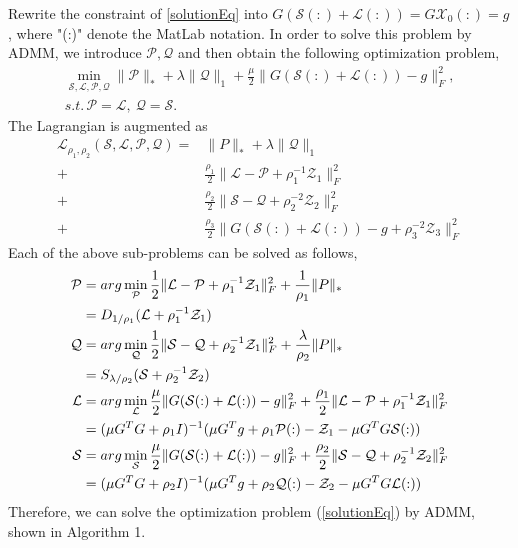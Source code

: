 \documentclass[journal,transmag]{IEEEtran}
\theoremstyle{plain}
\begin{document}
Rewrite the constraint of \ref{solutionEq} into $G\mathcal{(S(:)+L(:))}=G\mathcal{X}_0(:)=g$, where "(:)" denote the MatLab notation. In order to solve this problem by ADMM, we introduce $\mathcal{P}, \mathcal{Q}$ and then obtain the following optimization problem,
\begin{align*}
 \min_{\mathcal{S},\mathcal{L},\mathcal{P},\mathcal{Q}}\|\mathcal{P}
\|_*+\lambda \|\mathcal{Q}\|_1+\frac{\mu}{2}\|G\mathcal{(S(:)+L(:))}-g\|_{F}^2,\\
 s.t.\, \mathcal{P=L,~Q=S}.
\end{align*}
The Lagrangian is augmented as
\begin{align*}
\mathcal{L}_{\rho_1,\rho_2}(\mathcal{S},\mathcal{L},\mathcal{P},\mathcal{Q})
=&\|P\|_*+\lambda \|\mathcal{Q}\|_1\\
+&\frac{\rho_1}{2}\|\mathcal{L-P}+\rho_1^{-1}\mathcal{Z}_1\|_{F}^2\\
+&\frac{\rho_2}{2}\|\mathcal{S-Q}+\rho_2^{-2}\mathcal{Z}_2\|_{F}^2\\
+&\frac{\rho_3}{2}\|G\mathcal{(S(:)+L(:))}-g+\rho_3^{-2}\mathcal{Z}_3\|_{F}^2
\end{align*}
Each of the above sub-problems can be solved as follows,
\begin{align*}
\mathcal{P}
&=arg\min_{\mathcal{P}}\frac{1}{2}\|\mathcal{L-P}+\rho_1^{-1}\mathcal{Z}_1\|_F^2
 +\frac{1}{\rho_1}\|P\|_*\notag\\
&=D_{1/\rho_1}(\mathcal{L}+\rho_1^{-1}\mathcal{Z}_1)\\
\mathcal{Q}
&=arg\min_{\mathcal{Q}}\frac{1}{2}\|\mathcal{S-Q}+\rho_2^{-1}\mathcal{Z}_1\|_F^2
 +\frac{\lambda}{\rho_2}\|P\|_*\notag\\
&=S_{\lambda/\rho_2}(\mathcal{S}+\rho_2^{-1}\mathcal{Z}_2)\\
\mathcal{L}
&=arg\min_{\mathcal{L}}\frac{\mu}{2}\|G\mathcal{(S(:)+L(:))}-g\|_{F}^2
 +\frac{\rho_1}{2}\|\mathcal{L-P}+\rho_1^{-1}\mathcal{Z}_1\|_{F}^2\notag\\
&=(\mu G^TG+\rho_1I)^{-1}(\mu G^T g+\rho_1\mathcal{P}(:)-\mathcal{Z}_1
 -\mu G^TG\mathcal{S}(:))\\
\mathcal{S}
&=arg\min_{\mathcal{S}}\frac{\mu}{2}\|G\mathcal{(S(:)+L(:))}-g\|_{F}^2
 +\frac{\rho_2}{2}\|\mathcal{S-Q}+\rho_2^{-1}\mathcal{Z}_2\|_{F}^2\notag\\
&=(\mu G^TG+\rho_2I)^{-1}(\mu G^T g+\rho_2\mathcal{Q}(:)-\mathcal{Z}_2
 -\mu G^TG\mathcal{L}(:))
\end{align*}
Therefore, we can solve the optimization problem (\ref{solutionEq}) by ADMM, shown in Algorithm 1.
\end{document}
